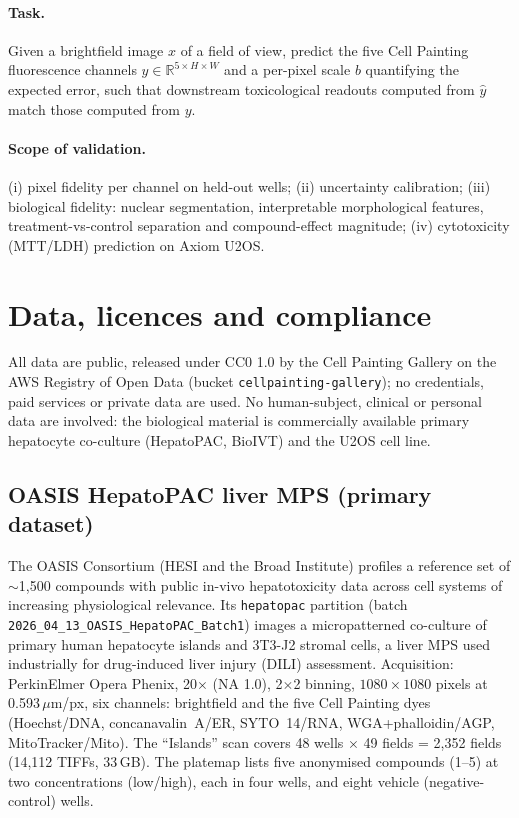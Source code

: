 \documentclass[11pt,a4paper]{article}
\begin{document}
\paragraph{Task.}
Given a brightfield image $x$ of a field of view, predict the five Cell Painting fluorescence channels $y \in \mathbb{R}^{5\times H\times W}$ and a per-pixel scale $b$ quantifying the expected error, such that downstream toxicological readouts computed from $\hat y$ match those computed from $y$.

\paragraph{Scope of validation.}
(i) pixel fidelity per channel on held-out wells; (ii) uncertainty calibration; (iii) biological fidelity: nuclear segmentation, interpretable morphological features, treatment-vs-control separation and compound-effect magnitude; (iv) cytotoxicity (MTT/LDH) prediction on Axiom U2OS.

\section{Data, licences and compliance}
\label{sec:data}

All data are public, released under CC0 1.0 by the Cell Painting Gallery \cite{weisbart2024} on the AWS Registry of Open Data (bucket \texttt{cellpainting-gallery}); no credentials, paid services or private data are used. No human-subject, clinical or personal data are involved: the biological material is commercially available primary hepatocyte co-culture (HepatoPAC, BioIVT) and the U2OS cell line.

\subsection{OASIS HepatoPAC liver MPS (primary dataset)}
The OASIS Consortium (HESI and the Broad Institute) \cite{oasis2025} profiles a reference set of $\sim$1,500 compounds with public in-vivo hepatotoxicity data across cell systems of increasing physiological relevance. Its \texttt{hepatopac} partition (batch \texttt{2026\_04\_13\_OASIS\_HepatoPAC\_Batch1}) images a micropatterned co-culture of primary human hepatocyte islands and 3T3-J2 stromal cells, a liver MPS used industrially for drug-induced liver injury (DILI) assessment. Acquisition: PerkinElmer Opera Phenix, 20$\times$ (NA 1.0), 2$\times$2 binning, $1080\times1080$ pixels at 0.593\,$\mu$m/px, six channels: brightfield and the five Cell Painting dyes (Hoechst/DNA, concanavalin~A/ER, SYTO~14/RNA, WGA+phalloidin/AGP, MitoTracker/Mito). The ``Islands'' scan covers 48 wells $\times$ 49 fields = 2,352 fields (14,112 TIFFs, 33\,GB). The platemap lists five anonymised compounds (1--5) at two concentrations (low/high), each in four wells, and eight vehicle (negative-control) wells.
\end{document}
